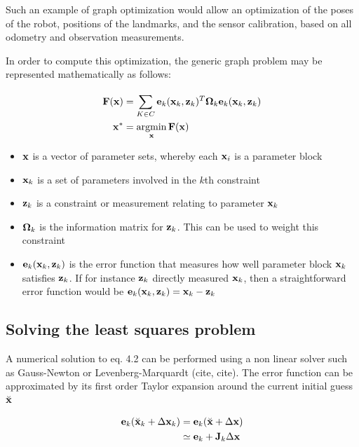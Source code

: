 Such an example of graph optimization would allow an optimization of the poses of the robot, positions of the landmarks, and the sensor calibration, based on all odometry and observation measurements.

In order to compute this optimization, the generic graph problem may be represented mathematically as follows:

 \begin{align}
   \bv{F}(\bv x) &= \sum\limits_{K \in C}^{} 
                 \bv e_k(\bv x_k, \bv z_k)^T 
                 \bv \Omega_k
                 \bv e_k(\bv x_k, \bv z_k)  \\ 
   \bv x^* &= \operatornamewithlimits{argmin}\limits_{\bv x}\bv{F}(\bv x)
 \end{align}

\begin{itemize}
 \item $\mathbf x$ is a vector of parameter sets, whereby each $\mathbf x_i$ is a parameter block
 \item $\mathbf x_k$ is a set of parameters involved in the $k$th constraint
 \item $\mathbf z_k$ is a constraint or measurement relating to parameter $\mathbf x_k$
 \item $\mathbf \Omega_k$ is the information matrix for $\mathbf z_k$.  This can be used to weight this constraint
 \item $\mathbf e_k(\mathbf x_k, \mathbf z_k)$ is the error function that measures how well parameter block $\mathbf x_k$ satisfies $\mathbf z_k$.  If for instance $\mathbf z_k$ directly measured $\mathbf x_k$, then a straightforward error function would be $\mathbf e_k(\mathbf x_k, \mathbf z_k) = \mathbf x_k - \mathbf z_k $
\end{itemize}

\subsection{Solving the least squares problem}

A numerical solution to eq. 4.2 can be performed using a non linear solver such as Gauss-Newton or Levenberg-Marquardt (cite, cite).  The error function can be approximated by its first order Taylor expansion around the current initial guess $\breve{\mathbf x}$

\begin{align}
  \mathbf e_k(\breve{\mathbf x}_k + \Delta \mathbf x_k) &= \mathbf e_k(\breve{\mathbf x} + \Delta \mathbf x) \\
      & \simeq \mathbf e_k + \mathbf J_k \Delta \mathbf x
\end{align}

